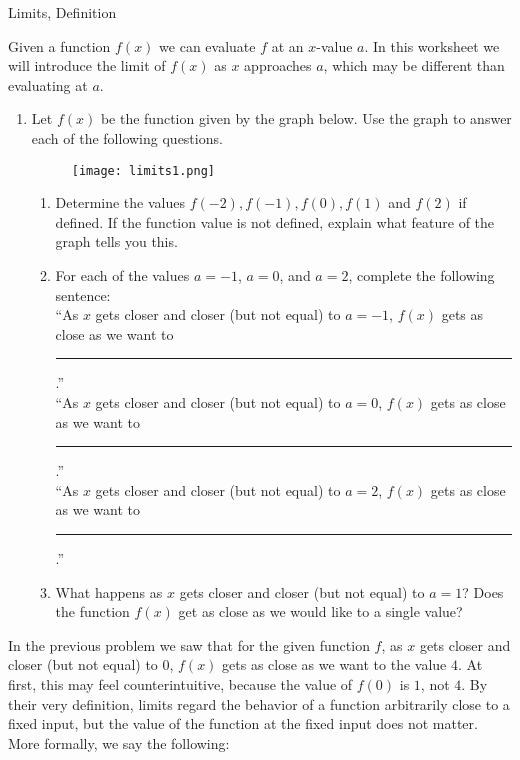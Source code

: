 \begin{tagblock}{Limits, Definition}
\begin{question}
	
Given a function $f(x)$ we can evaluate $f$ at an $x$-value $a$.  In this worksheet we will introduce the limit of $f(x)$ as $x$ approaches $a$, which may be different than evaluating at $a$.  


\begin{enumerate}
\item Let $f(x)$ be the function given by the graph below. Use the graph to answer each of the following questions.
\begin{figure}[h]
\centering
\texttt{[image: limits1.png]}
\end{figure}

\begin{enumerate}
\item     Determine the values $f(-2), f(-1), f(0), f(1)$ and $f(2)$ if defined.   If the function value is not defined, explain what feature of the graph tells you this.

\vspace{1in}

\item For each of the values $a=-1$, $a=0$, and $a=2$, complete the following sentence: \\
 ``As $x$ gets closer and closer (but not equal) to $a=-1$, $f(x)$
gets as close as we want to  \rule{1.1cm}{0.1mm} .'' \\ \bigskip
``As $x$ gets closer and closer (but not equal) to $a=0$, $f(x)$
gets as close as we want to  \rule{1.1cm}{0.1mm} .'' \\ \bigskip
``As $x$ gets closer and closer (but not equal) to $a= 2$, $f(x)$
gets as close as we want to  \rule{1.1cm}{0.1mm} .'' \\ \bigskip




\item What happens as $x$ gets closer and closer (but not equal) to $a=1$? Does the function $f(x)$ get as close as we would like to a single value?

\end{enumerate}
\end{enumerate}


\newpage
In the previous problem we saw that for the given function $f$, as $x$ gets closer and closer (but not equal) to $0$, $f(x)$ gets as close as we want to the value $4$. At first, this may feel counterintuitive, because the value of $f(0)$ is $1$, not $4$. By their very definition, limits regard the behavior of a function arbitrarily close to a fixed input, but the value of the function at the fixed input does not matter. More formally, we say the following:




\end{question}
\end{tagblock}
